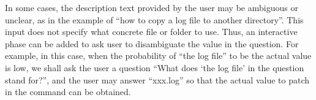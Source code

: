 In some cases, the description text provided by the user may be ambiguous or unclear, as in the example of ``how to copy a log file to another directory''. This input does not specify what concrete file or folder to use. Thus, an interactive phase can be added to ask user to disambiguate the value in the question. For example, in this case, when the probability of ``the log file'' to be the actual value is low, we shall ask the user a question ``What does `the log file' in the question stand for?'', and the user may answer ``xxx.log'' so that the actual value to patch in the command can be obtained.
